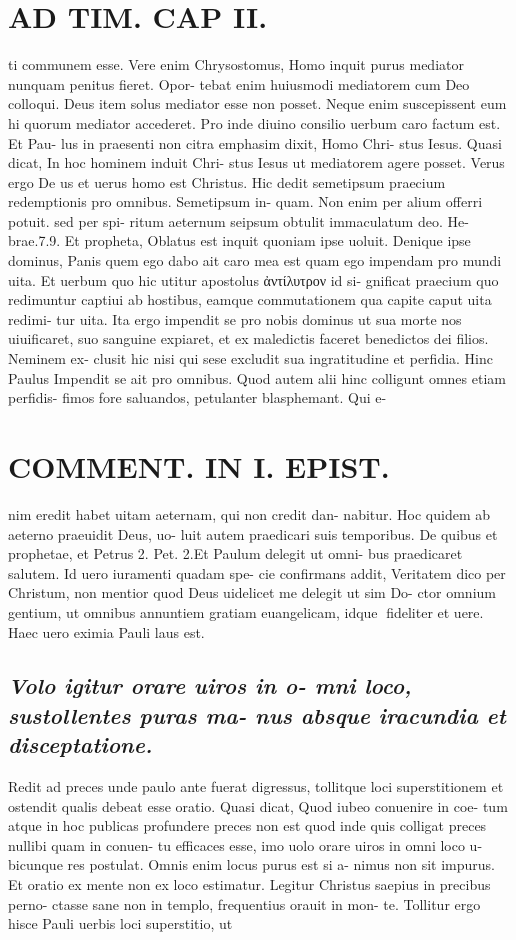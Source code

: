 \documentclass{article}
\begin{document}
\begin{pages}
\section*{AD TIM. CAP II. }
\marginpar{[ p.117 ]}\pstart ti communem esse. Vere enim Chrysostomus, Homo inquit purus mediator nunquam penitus fieret. Opor- tebat enim huiusmodi mediatorem cum Deo colloqui. Deus item solus mediator esse non posset. Neque enim suscepissent eum hi quorum mediator accederet. Pro inde diuino consilio uerbum caro factum est. Et Pau- lus in praesenti non citra emphasim dixit, Homo Chri- stus Iesus. Quasi dicat, In hoc hominem induit Chri- stus Iesus ut mediatorem agere posset. Verus ergo De us et uerus homo est Christus. Hic dedit semetipsum praecium redemptionis pro omnibus. Semetipsum in- quam. Non enim per alium offerri potuit. sed per spi- ritum aeternum seipsum obtulit immaculatum deo. He- brae.7.9. Et propheta, Oblatus est inquit quoniam ipse uoluit. Denique ipse dominus, Panis quem ego dabo ait caro mea est quam ego impendam pro mundi uita. Et uerbum quo hic utitur apostolus ἀντίλυτρον id si- gnificat praecium quo redimuntur captiui ab hostibus, eamque commutationem qua capite caput uita redimi- tur uita. Ita ergo impendit se pro nobis dominus ut sua morte nos uiuificaret, suo sanguine expiaret, et ex maledictis faceret benedictos dei filios. Neminem ex- clusit hic nisi qui sese excludit sua ingratitudine et perfidia. Hinc Paulus Impendit se ait pro omnibus. Quod autem alii hinc colligunt omnes etiam perfidis- fimos fore saluandos, petulanter blasphemant. Qui e-  \pend
\section*{COMMENT. IN I. EPIST. }\pstart nim eredit habet uitam aeternam, qui non credit dan- nabitur. Hoc quidem ab aeterno praeuidit Deus, uo- luit autem praedicari suis temporibus. De quibus et prophetae, et Petrus 2. Pet. 2.Et Paulum delegit ut omni- bus praedicaret salutem. Id uero iuramenti quadam spe- cie confirmans addit, Veritatem dico per Christum, non mentior quod Deus uidelicet me delegit ut sim Do- ctor omnium gentium, ut omnibus annuntiem gratiam euangelicam, idque fideliter et uere. Haec uero eximia Pauli laus est.  \pend 
{}
{}
\subsection*{\textit{Volo igitur orare uiros in o- mni loco, sustollentes puras ma- nus absque iracundia et disceptatione. }}\pstart Redit ad preces unde paulo ante fuerat digressus, tollitque loci superstitionem et ostendit qualis debeat esse oratio. Quasi dicat, Quod iubeo conuenire in coe- tum atque in hoc publicas profundere preces non est quod inde quis colligat preces nullibi quam in conuen- tu efficaces esse, imo uolo orare uiros in omni loco u- bicunque res postulat. Omnis enim locus purus est si a- nimus non sit impurus. Et oratio ex mente non ex loco estimatur. Legitur Christus saepius in precibus perno- ctasse sane non in templo, frequentius orauit in mon- te. Tollitur ergo hisce Pauli uerbis loci superstitio, ut  \pend

\end{pages}
\end{document}
